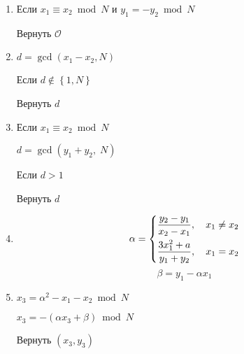 \documentclass[12pt]{article}
\newcommand{\bigO}{\mathcal{O}}
\theoremstyle{definition}
\theoremstyle{definition}
\theoremstyle{definition}
\begin{document}
\begin{enumerate}
	\item Если $x_1 \equiv x_2\bmod N$ и $y_1 =  - y_2\bmod N$
	
	\hspace{5ex} Вернуть $\bigO$
	
	\item $d = \gcd (x_1 - x_2,N)$
	
	\hspace{5ex} Если $d\not  \in \left\{1,N\right\}$

	\hspace{10ex} Вернуть $d$
	
	\item Если $x_1 \equiv x_2\bmod N$
	
	\hspace{5ex} $d = \gcd (y_1 + y_2,\;N)$
	
	\hspace{5ex} Если $d > 1$
	
	\hspace{10ex} Вернуть $d$
	
	\item 
    \[
    	\alpha  = \left\{ \begin{gathered}
    	\frac{y_2 - y_1}{x_2 - x_1},\quad x_1 \ne x_2 \hfill \\
    	\frac{3x_1^2 + a}{y_1 + y_2},\quad x_1 = x_2 \hfill \\ 
    	\end{gathered}  \right.
	\]
	\[
    	\beta  = y_1 - \alpha x_1
	\]
	
	\item $x_3 = \alpha ^2 - x_1 - x_2\bmod N$
	
	$x_3 =  - ( \alpha x_3 + \beta  )\bmod N$
	
	Вернуть $( x_3, y_3 )$
	
\end{enumerate}
\end{document}
